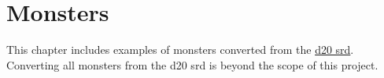 \section{Monsters}
This chapter includes examples of monsters converted from the \href{http://www.wizards.com/default.asp?x=d20/article/srd35}{d20 srd}.
Converting all monsters from the d20 srd is beyond the scope of this project.



